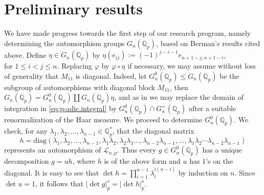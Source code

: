 \documentclass[12pt]{article}
\begin{document}
\section{Preliminary results}
\label{preliminary.results}
We have made progress towards the first step of our research program, namely determining the automorphism groups $G_{n}(\mathbb{Q}_p)$, based on Berman's results cited above.
Define $\eta\in{G_{n}(\mathbb{Q}_p)}$ by $\eta(e_{ij}):=(-1)^{j-i-1}e_{n+1-j,n+1-i}$,\\ for $1\leq{i}<{j}\leq{n}$. Replacing $\varphi$ by $\varphi\circ\eta$ if necessary, we may assume without loss of generality that $M_{11}$ is diagonal. Indeed, let $G_{n}^{0}(\mathbb{Q}_{p})\leq{G_{n}(\mathbb{Q}_{p})}$ be the subgroup of automorphisms with diagonal block $M_{11}$, then\\ $G_{n}(\mathbb{Q}_{p})=G_{n}^{0}(\mathbb{Q}_{p})\coprod{G_{n}(\mathbb{Q}_{p})}\eta$, and as in \cite[Proposition 2.1]{DuSautoyLubotzky} we may replace the domain of integration in \eqref{eq:p-adic.integral} by $G_{n}^{0}(\mathbb{Q}_{p})\cap{G_{n}^{+}(\mathbb{Q}_{p})}$ after a suitable renormalization of the Haar measure. We proceed to determine $G_{n}^{0}(\mathbb{Q}_{p})$.
We check, for any $\lambda_{1},\lambda_{2},\dots,\lambda_{n-1}\in\mathbb{Q}_{p}^{\ast}$, that the diagonal matrix \[h=\mathrm{diag}(\lambda_{1},\lambda_{2},\dots,\lambda_{n-1},\lambda_{1}\lambda_{2},\lambda_{2}\lambda_{3}\dots,\lambda_{n-2}\lambda_{n-1},\dots,\lambda_{1}\lambda_{2}\cdots\lambda_{n-2}\lambda_{n-1})\]
represents an automorphism of $\mathcal{L}_{n,p}$. Thus every $g\in{G_{n}^{0}(\mathbb{Q}_{p})}$ has a unique decomposition $g=uh$, where $h$ is of the above form and $u$ has $1$'s on the diagonal. It is easy to see that $\det{h}=\prod_{i=1}^{n-1}\lambda_i^{i(n-i)}$ by induction on $n$. Since $\det{u}=1$, it follows that $|\det{g}|_{p}^{s}=|\det{h}|_{p}^{s}$.
\end{document}
